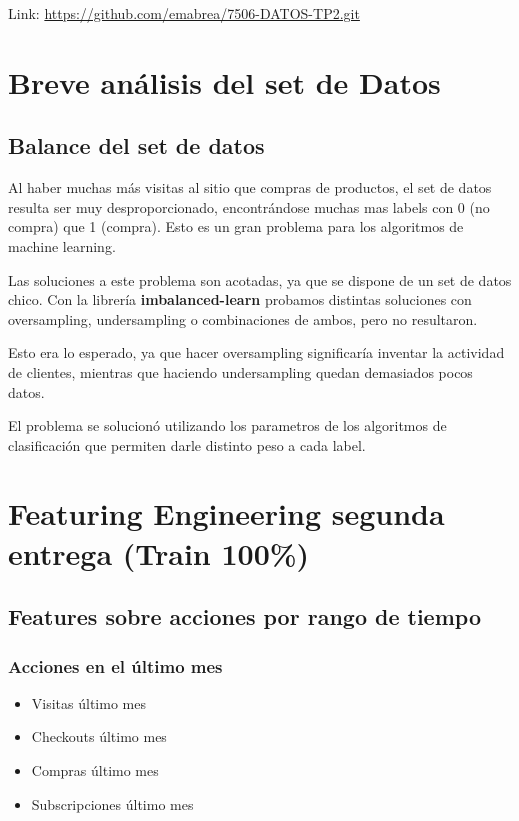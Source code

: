 \documentclass[a4paper ,12pt]{article}
\begin{document}
Link: \url{https://github.com/emabrea/7506-DATOS-TP2.git}

\newpage
\section{Breve análisis del set de Datos}
\subsection{Balance del set de datos}
Al haber muchas más visitas al sitio que compras de productos, el set de datos resulta ser muy desproporcionado, encontrándose muchas mas labels con 0 (no compra) que 1 (compra). Esto es un gran problema para los algoritmos de machine learning.

Las soluciones a este problema son acotadas, ya que se dispone de un set de datos chico. Con la librería \textbf{imbalanced-learn} probamos distintas soluciones con oversampling, undersampling o combinaciones de ambos, pero no resultaron.

Esto era lo esperado, ya que hacer oversampling significaría inventar la actividad de clientes, mientras que haciendo undersampling quedan demasiados pocos datos.

El problema se solucionó utilizando los parametros de los algoritmos de clasificación que permiten darle distinto peso a cada label.



\newpage
\section{Featuring Engineering segunda entrega (Train 100\%)}

\subsection{ Features sobre acciones por rango de tiempo }

		
		\subsubsection{Acciones en el último mes}
	
		\begin{itemize}
		 	
		\item Visitas último mes
		
		\item Checkouts último mes
		
		\item Compras último mes
		
		\item Subscripciones último mes
		\end{itemize}
		
\end{document}
